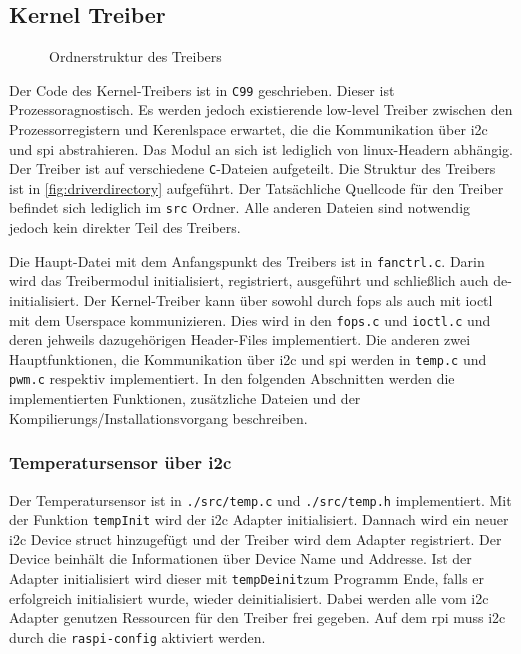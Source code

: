 \subsection{Kernel Treiber}

\begin{wrapfigure}[25]{o}[1cm]{8cm}
\caption{Ordnerstruktur des Treibers}
\label{fig:driverdirectory}
\end{wrapfigure}

Der Code des Kernel-Treibers ist in \texttt{C99} geschrieben.
Dieser ist Prozessoragnostisch.
Es werden jedoch existierende low-level Treiber zwischen den Prozessorregistern und Kerenlspace erwartet, die die Kommunikation über \gls{i2c} und \gls{spi} abstrahieren.
Das Modul an sich ist lediglich von linux-Headern abhängig.
Der Treiber ist auf verschiedene \texttt{C}-Dateien aufgeteilt.
Die Struktur des Treibers ist in \autoref{fig:driverdirectory} aufgeführt.
Der Tatsächliche Quellcode für den Treiber befindet sich lediglich im \texttt{src} Ordner.
Alle anderen Dateien sind notwendig jedoch kein direkter Teil des Treibers.

Die Haupt-Datei mit dem Anfangspunkt des Treibers ist in \texttt{fanctrl.c}.
Darin wird das Treibermodul initialisiert, registriert, ausgeführt und schließlich auch de-initialisiert.
Der Kernel-Treiber kann über sowohl durch \gls{fops} als auch mit \gls{ioctl} mit dem Userspace kommunizieren.
Dies wird in den \texttt{fops.c} und \texttt{ioctl.c} und deren jehweils dazugehörigen Header-Files implementiert.
Die anderen zwei Hauptfunktionen, die Kommunikation über \gls{i2c} und \gls{spi} werden in \texttt{temp.c} und \texttt{pwm.c} respektiv implementiert.
In den folgenden Abschnitten werden die implementierten Funktionen, zusätzliche Dateien und der Kompilierungs/Installationsvorgang beschreiben.

\subsubsection{Temperatursensor über \acrshort{i2c}}

Der Temperatursensor ist in \texttt{./src/temp.c} und \texttt{./src/temp.h} implementiert.
Mit der Funktion \texttt{tempInit} wird der \gls{i2c} Adapter initialisiert.
Dannach wird ein neuer \gls{i2c} Device struct hinzugefügt und der Treiber wird dem Adapter registriert.
Der Device beinhält die Informationen über Device Name und Addresse.
Ist der Adapter initialisiert wird dieser mit \texttt{tempDeinit}zum Programm Ende, falls er erfolgreich initialisiert wurde, wieder deinitialisiert.
Dabei werden alle vom \gls{i2c} Adapter genutzen Ressourcen für den Treiber frei gegeben.
Auf dem \gls{rpi} muss \gls{i2c} durch die \texttt{raspi-config} aktiviert werden.

